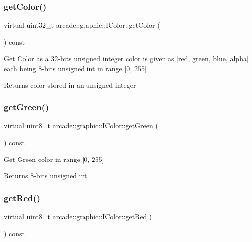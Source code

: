 \subsubsection{\texorpdfstring{getColor()}{getColor()}}
{\footnotesize\ttfamily virtual uint32\+\_\+t arcade\+::graphic\+::\+I\+Color\+::get\+Color (\begin{DoxyParamCaption}{ }\end{DoxyParamCaption}) const\hspace{0.3cm}{\ttfamily [pure virtual]}}

Get Color as a 32-\/bits unsigned integer color is given as \mbox{[}red, green, blue, alpha\mbox{]} each being 8-\/bits unsigned int in range \mbox{[}0, 255\mbox{]} \begin{DoxyReturn}{Returns}
color stored in an unsigned integer 
\end{DoxyReturn}
\mbox{\label{classarcade_1_1graphic_1_1_i_color_a415154c0e5a0cdd323de24a647cc09d5}} 
\subsubsection{\texorpdfstring{getGreen()}{getGreen()}}
{\footnotesize\ttfamily virtual uint8\+\_\+t arcade\+::graphic\+::\+I\+Color\+::get\+Green (\begin{DoxyParamCaption}{ }\end{DoxyParamCaption}) const\hspace{0.3cm}{\ttfamily [pure virtual]}}

Get Green color in range \mbox{[}0, 255\mbox{]} \begin{DoxyReturn}{Returns}
8-\/bits unsigned int 
\end{DoxyReturn}
\mbox{\label{classarcade_1_1graphic_1_1_i_color_a054e1eaae2aba7396d8d53e72008be71}} 
\subsubsection{\texorpdfstring{getRed()}{getRed()}}
{\footnotesize\ttfamily virtual uint8\+\_\+t arcade\+::graphic\+::\+I\+Color\+::get\+Red (\begin{DoxyParamCaption}{ }\end{DoxyParamCaption}) const\hspace{0.3cm}{\ttfamily [pure virtual]}}

